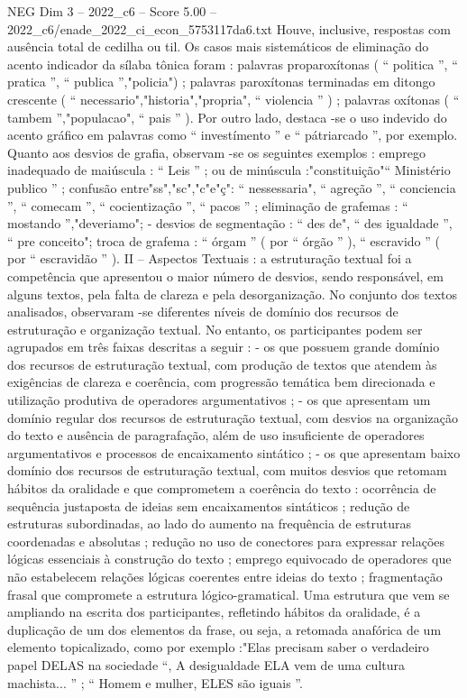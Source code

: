 \begin{textsample}{NEG Dim 3 – 2022\_c6 – Score 5.00 – 2022\_c6/enade\_2022\_ci\_econ\_5753117da6.txt}
Houve, inclusive, respostas com ausência total de cedilha ou til.
Os casos mais sistemáticos de eliminação do acento indicador da sílaba tônica foram : palavras proparoxítonas ( “ politica ”, “ pratica ”, “ publica ”,"policia") ; palavras paroxítonas terminadas em ditongo crescente ( “ necessario","historia","propria", “ violencia ” ) ; palavras oxítonas ( “ tambem ”,"populacao", “ pais ” ).
Por outro lado, destaca -se o uso indevido do acento gráfico em palavras como “ investímento ” e “ pátriarcado ”, por exemplo.
Quanto aos desvios de grafia, observam -se os seguintes exemplos : emprego inadequado de maiúscula : “ Leis ” ; ou de minúscula :"constituição"“ Ministério publico ” ; confusão entre"ss","sc","c"e"ç": “ nessessaria", “ agreção ”, “ conciencia ”, “ comecam ”, “ cocientização ”, “ pacos ” ; eliminação de grafemas : “ mostando ”,"deveriamo"; - desvios de segmentação : “ des de", “ des igualdade ”, “ pre conceito"; troca de grafema : “ órgam ” ( por “ órgão ” ), “ escravido ” ( por “ escravidão ” ).
II – Aspectos Textuais : a estruturação textual foi a competência que apresentou o maior número de desvios, sendo responsável, em alguns textos, pela falta de clareza e pela desorganização.
No conjunto dos textos analisados, observaram -se diferentes níveis de domínio dos recursos de estruturação e organização textual.
No entanto, os participantes podem ser agrupados em três faixas descritas a seguir : - os que possuem grande domínio dos recursos de estruturação textual, com produção de textos que atendem às exigências de clareza e coerência, com progressão temática bem direcionada e utilização produtiva de operadores argumentativos ; - os que apresentam um domínio regular dos recursos de estruturação textual, com desvios na organização do texto e ausência de paragrafação, além de uso insuficiente de operadores argumentativos e processos de encaixamento sintático ; - os que apresentam baixo domínio dos recursos de estruturação textual, com muitos desvios que retomam hábitos da oralidade e que comprometem a coerência do texto : ocorrência de sequência justaposta de ideias sem encaixamentos sintáticos ; redução de estruturas subordinadas, ao lado do aumento na frequência de estruturas coordenadas e absolutas ; redução no uso de conectores para expressar relações lógicas essenciais à construção do texto ; emprego equivocado de operadores que não estabelecem relações lógicas coerentes entre ideias do texto ; fragmentação frasal que compromete a estrutura lógico-gramatical.
Uma estrutura que vem se ampliando na escrita dos participantes, refletindo hábitos da oralidade, é a duplicação de um dos elementos da frase, ou seja, a retomada anafórica de um elemento topicalizado, como por exemplo :"Elas precisam saber o verdadeiro papel DELAS na sociedade “, A desigualdade ELA vem de uma cultura machista... ” ; “ Homem e mulher, ELES são iguais ”.

\end{textsample}

